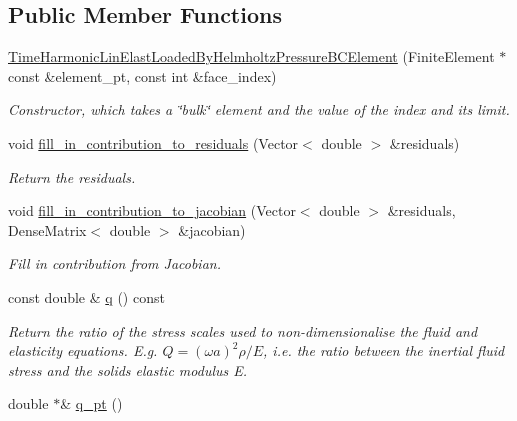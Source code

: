 \subsection*{Public Member Functions}
\begin{DoxyCompactItemize}
\item 
\hyperlink{classoomph_1_1TimeHarmonicLinElastLoadedByHelmholtzPressureBCElement_af0ac460cd2caeb9ba7c7b27e13d5ebc6}{Time\+Harmonic\+Lin\+Elast\+Loaded\+By\+Helmholtz\+Pressure\+B\+C\+Element} (Finite\+Element $\ast$const \&element\+\_\+pt, const int \&face\+\_\+index)
\begin{DoxyCompactList}\small\item\em Constructor, which takes a \char`\"{}bulk\char`\"{} element and the value of the index and its limit. \end{DoxyCompactList}\item 
void \hyperlink{classoomph_1_1TimeHarmonicLinElastLoadedByHelmholtzPressureBCElement_a0a69b95db2d95da34929a9750d3bce3d}{fill\+\_\+in\+\_\+contribution\+\_\+to\+\_\+residuals} (Vector$<$ double $>$ \&residuals)
\begin{DoxyCompactList}\small\item\em Return the residuals. \end{DoxyCompactList}\item 
void \hyperlink{classoomph_1_1TimeHarmonicLinElastLoadedByHelmholtzPressureBCElement_a151fa0b3aa8df4a582d62d82ae42f40e}{fill\+\_\+in\+\_\+contribution\+\_\+to\+\_\+jacobian} (Vector$<$ double $>$ \&residuals, Dense\+Matrix$<$ double $>$ \&jacobian)
\begin{DoxyCompactList}\small\item\em Fill in contribution from Jacobian. \end{DoxyCompactList}\item 
const double \& \hyperlink{classoomph_1_1TimeHarmonicLinElastLoadedByHelmholtzPressureBCElement_af8f267ad94739fefd852796732eea1bd}{q} () const
\begin{DoxyCompactList}\small\item\em Return the ratio of the stress scales used to non-\/dimensionalise the fluid and elasticity equations. E.\+g. $ Q = (\omega a)^2 \rho/E $, i.\+e. the ratio between the inertial fluid stress and the solid\textquotesingle{}s elastic modulus E. \end{DoxyCompactList}\item 
double $\ast$\& \hyperlink{classoomph_1_1TimeHarmonicLinElastLoadedByHelmholtzPressureBCElement_a2b836c57f104d02c934615333f306a21}{q\+\_\+pt} ()

\end{DoxyCompactItemize}
